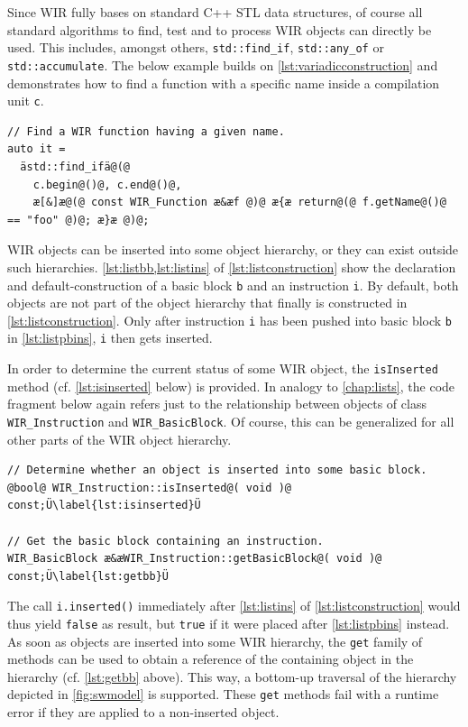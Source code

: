 Since \gls{WIR} fully bases on standard C++ \gls{STL} data structures, of course all standard algorithms to find, test and to process \gls{WIR} objects can directly be used.
This includes, amongst others, \texttt{std::find\_if}, \texttt{std::any\_of} or \texttt{std::accumulate}.
The below example builds on \cref{lst:variadicconstruction} and demonstrates how to find a function with a specific name inside a compilation unit \texttt{c}.

\begin{lstlisting}[style=code,float=h]
// Find a WIR function having a given name.
auto it =
  ästd::find_ifä@(@
    c.begin@()@, c.end@()@,
    æ[&]æ@(@ const WIR_Function æ&æf @)@ æ{æ return@(@ f.getName@()@ == "foo" @)@; æ}æ @)@;
\end{lstlisting}

\gls{WIR} objects can be inserted into some object hierarchy, or they can exist outside such hierarchies.
\cref{lst:listbb,lst:listins} of \cref{lst:listconstruction} show the declaration and default-construction of a basic block \texttt{b} and an instruction \texttt{i}.
By default, both objects are not part of the object hierarchy that finally is constructed in \cref{lst:listconstruction}.
Only after instruction \texttt{i} has been pushed into basic block \texttt{b} in \cref{lst:listpbins}, \texttt{i} then gets inserted.

In order to determine the current status of some \gls{WIR} object, the \texttt{isInserted} method (cf. \cref{lst:isinserted} below) is provided.
In analogy to \cref{chap:lists}, the code fragment below again refers just to the relationship between objects of class \texttt{WIR\_Instruction} and \texttt{WIR\_BasicBlock}.
Of course, this can be generalized for all other parts of the \gls{WIR} object hierarchy.

\begin{lstlisting}[style=code,float=h]
// Determine whether an object is inserted into some basic block.
@bool@ WIR_Instruction::isInserted@( void )@ const;Ü\label{lst:isinserted}Ü

// Get the basic block containing an instruction.
WIR_BasicBlock æ&æWIR_Instruction::getBasicBlock@( void )@ const;Ü\label{lst:getbb}Ü
\end{lstlisting}

The call \texttt{i.inserted()} immediately after \cref{lst:listins} of \cref{lst:listconstruction} would thus yield \texttt{false} as result, but \texttt{true} if it were placed after \cref{lst:listpbins} instead.
As soon as objects are inserted into some \gls{WIR} hierarchy, the \texttt{get} family of methods can be used to obtain a reference of the containing object in the hierarchy (cf. \cref{lst:getbb} above).
This way, a bottom-up traversal of the hierarchy depicted in \cref{fig:swmodel} is supported.
These \texttt{get} methods fail with a runtime error if they are applied to a non-inserted object.

\cleardoubleoddpage
